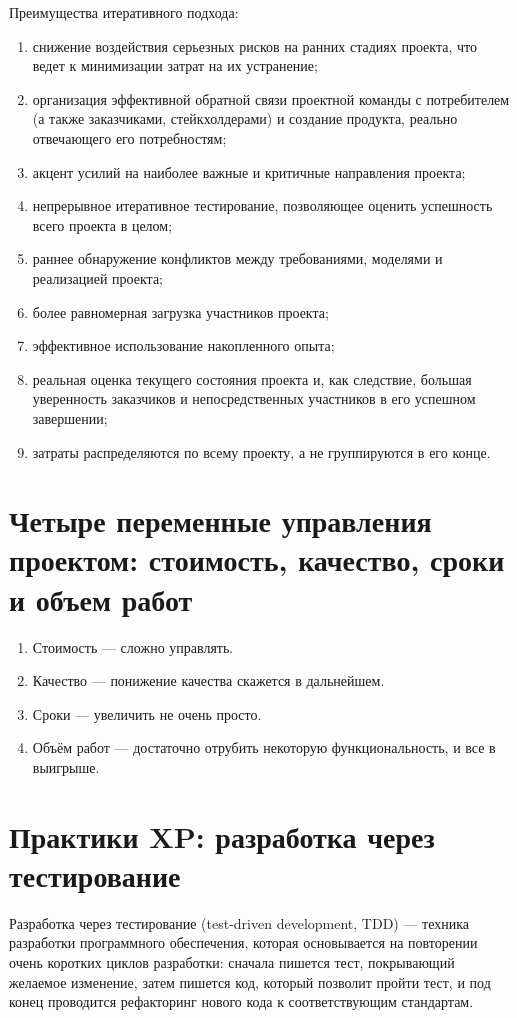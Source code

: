 \documentclass{article}
\let\stdsection\section
\renewcommand\section{\newpage\stdsection}
\begin{document}
    Преимущества итеративного подхода:
    \begin{enumerate}
        \item снижение воздействия серьезных рисков на ранних стадиях проекта, что ведет к минимизации затрат на их устранение;
        \item организация эффективной обратной связи проектной команды с потребителем (а также заказчиками, стейкхолдерами) и создание продукта, реально отвечающего его потребностям;
        \item акцент усилий на наиболее важные и критичные направления проекта;
        \item непрерывное итеративное тестирование, позволяющее оценить успешность всего проекта в целом;
        \item раннее обнаружение конфликтов между требованиями, моделями и реализацией проекта;
        \item более равномерная загрузка участников проекта;
        \item эффективное использование накопленного опыта;
        \item реальная оценка текущего состояния проекта и, как следствие, большая уверенность заказчиков и непосредственных участников в его успешном завершении;
        \item затраты распределяются по всему проекту, а не группируются в его конце.
    \end{enumerate}

\section{Четыре переменные управления проектом: стоимость, качество, сроки и объем работ}
    \begin{enumerate}
        \item Стоимость — сложно управлять.
        \item Качество — понижение качества скажется в дальнейшем.
        \item Сроки — увеличить не очень просто.
        \item Объём работ — достаточно отрубить некоторую функциональность, и все в выигрыше.
    \end{enumerate}

\section{Практики XP: разработка через тестирование}
    Разработка через тестирование (test-driven development, TDD) — техника разработки программного обеспечения, которая основывается на повторении очень коротких циклов разработки: сначала пишется тест, покрывающий желаемое изменение, затем пишется код, который позволит пройти тест, и под конец проводится рефакторинг нового кода к соответствующим стандартам.
\end{document}
